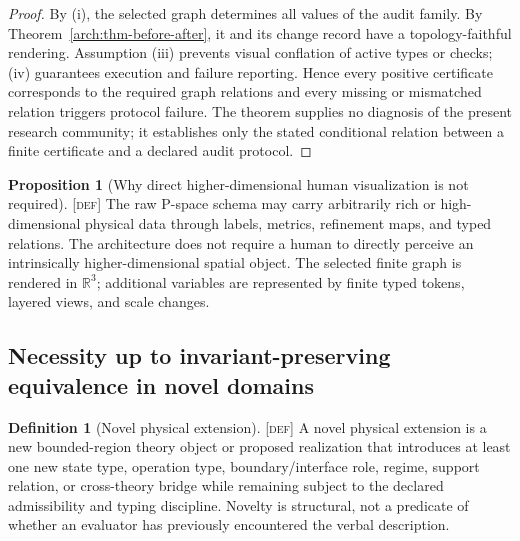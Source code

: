 \documentclass[11pt]{article}
\newcommand{\Defn}{\textsc{[def]}}
\theoremstyle{definition}
\newtheorem{sdefinition}{Definition}
\newtheorem{sproposition}{Proposition}
\begin{document}
\begin{proof}
By (i), the selected graph determines all values of the audit family. By
Theorem~\ref{arch:thm-before-after}, it and its change record have a
topology-faithful rendering. Assumption (iii) prevents visual conflation of active
types or checks; (iv) guarantees execution and failure reporting. Hence every
positive certificate corresponds to the required graph relations and every missing
or mismatched relation triggers protocol failure. The theorem supplies no
diagnosis of the present research community; it establishes only the stated
conditional relation between a finite certificate and a declared audit protocol.
\end{proof}

\begin{sproposition}[Why direct higher-dimensional human visualization is not required]
\label{arch:prop-highdim}
\Defn{} The raw P-space schema may carry arbitrarily rich or high-dimensional
physical data through labels, metrics, refinement maps, and typed relations. The
architecture does not require a human to directly perceive an intrinsically
higher-dimensional spatial object. The selected finite graph is rendered in
$\mathbb R^3$; additional variables are represented by finite typed tokens,
layered views, and scale changes.
\end{sproposition}

\subsection{Necessity up to invariant-preserving equivalence in novel domains}

\begin{sdefinition}[Novel physical extension]
\label{arch:def-novel-extension}
\Defn{} A novel physical extension is a new bounded-region theory object or
proposed realization that introduces at least one new state type, operation type,
boundary/interface role, regime, support relation, or cross-theory bridge while
remaining subject to the declared admissibility and typing discipline. Novelty is
structural, not a predicate of whether an evaluator has previously encountered the
verbal description.
\end{sdefinition}
\end{document}
